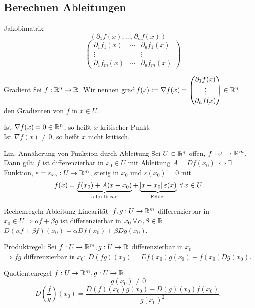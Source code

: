 \documentclass[main.tex]{subfiles}
\begin{document}
\subsection*{Berechnen Ableitungen}

\begin{karte}{Jakobimatrix}
    \[ (\partial_1f(x), \dots, \partial_n f(x)) \]
    \[ = \begin{pmatrix}
        \partial_1 f_1(x) & \cdots & \partial_n f_1(x) \\
        \vdots & & \vdots \\
        \partial_1 f_m(x) & \cdots & \partial_n f_m(x)
    \end{pmatrix} \]
\end{karte}

\begin{karte}{Gradient}
    Sei \( f : \mathbb{R}^n \rightarrow \mathbb{R} \).
    Wir nennen \( \operatorname{grad} f(x) := \nabla f(x) = \begin{pmatrix}
        \partial_1 f(x) \\
        \vdots \\
        \partial_n f(x)
    \end{pmatrix} \in \mathbb{R}^n \) den Gradienten von \(f\) in 
    \( x \in U \).

    Ist \( \nabla f(x) = 0 \in \mathbb{R}^n \), so heißt \(x\) 
    kritischer Punkt.\\
    Ist \( \nabla f(x) \neq 0 \), so heißt \(x\) 
    nicht kritisch.
\end{karte}

\begin{karte}{Lin. Annäherung von Funktion durch Ableitung}
    Sei \( U \subset \mathbb{R}^n\) offen, \(f : U \rightarrow \mathbb{R}^m\).
    Dann gilt:
    \(f\) ist differenzierbar in \(x_0 \in U \) mit Ableitung
    \( A = Df(x_0) \)
    \( \Leftrightarrow \exists \) Funktion, \( \varepsilon = 
    \varepsilon_{x_0} : U \rightarrow \mathbb{R}^m \), stetig in \(x_0\) und
    \(\varepsilon(x_0) = 0\) mit 
    \[ f(x) = \underbrace{f(x_0) + A(x-x_0)}_{\text{affin linear}} 
    + \underbrace{\abs{x-x_0}\varepsilon(x)}_{\text{Fehler}}
    \; \forall x \in U \]
\end{karte}

\begin{karte}{Rechenregeln Ableitung}
    Linearität: \( f,g : U \rightarrow \mathbb{R}^m \) differenzierbar in 
    \(x_0 \in U \Rightarrow \alpha f + \beta g \) ist differenzierbar 
    in \(x_0 \; \forall \alpha, \beta \in \R\) \\
    \( D(\alpha f + \beta f)(x_0) = \alpha Df(x_0) + \beta Dg(x_0) \).

    Produktregel: Sei \( f : U \rightarrow \mathbb{R}^m, g : U \rightarrow \mathbb{R} \)
    differenzierbar in \(x_0\) \\
    \( \Rightarrow  fg \) differenzierbar in \(x_0\): 
    \( D(fg)(x_0) = Df(x_0)g(x_0) + f(x_0)Dg(x_0) \).

    Quotientenregel \( f : U \rightarrow \mathbb{R}^m, g : U \rightarrow \mathbb{R} \)
    \[ g(x_0) \neq 0 \]
    \[ D\left(\frac{f}{g}\right)(x_0) 
    = \frac{D(f)(x_0) g(x_0) - D(g)(x_0) f(x_0)}{g(x_0)^2}. \]
\end{karte}
\end{document}
